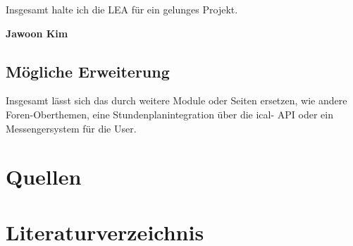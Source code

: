 \documentclass[12pt,titlepage]{article}
\begin{document}
Insgesamt halte ich die LEA für ein gelunges Projekt.


\textbf{Jawoon Kim}

\subsection{Mögliche Erweiterung}

Insgesamt lässt sich das durch weitere Module oder Seiten ersetzen, wie andere Foren-Oberthemen, eine Stundenplanintegration über die ical- API oder 
ein Messengersystem für die User.

\section{Quellen}

\section{Literaturverzeichnis}
\end{document}
